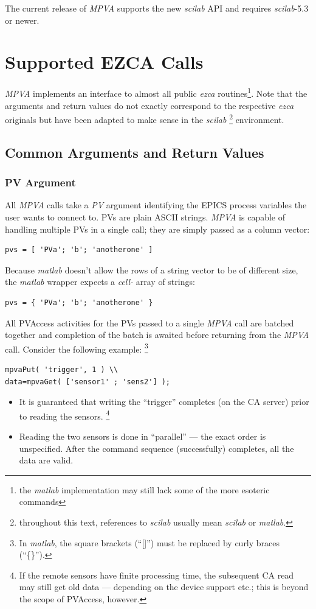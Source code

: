 \documentclass{article}
\newcommand{\sca}{\ita{MPVA}}
\newcommand{\scilab}{\ita{scilab}}
\newcommand{\matlab}{\ita{matlab}}
\newcommand{\ezca}{\ita{ezca}}
\newcommand{\pbrk}{\pagebreak[3]}
\newcommand{\ita}[1]{\emph{#1}}
\renewcommand{\pbrk}{}
\begin{document}
The current release of \sca{} supports the new \scilab{} API and
requires \scilab-5.3 or newer.

\vspace*{\fill}
\pbrk
\section{Supported EZCA Calls}
\sca{} implements an interface to almost all public
\ezca{} routines\footnote{%
the \matlab{} implementation may still lack some of the
more esoteric commands}. Note that the arguments and
return values do not exactly correspond to the respective
\ezca{} originals but have been adapted to make sense
in the  \scilab{}%
\footnote{throughout this text, references to \scilab{}
usually mean \scilab{} or \matlab.}
environment.

\subsection{Common Arguments and Return Values}
\subsubsection{PV Argument}
All \sca{} calls take a \ita{PV} argument identifying
the EPICS process variables the user wants to connect to.
PVs are plain ASCII strings. \sca{} is capable of handling
multiple PVs in a single call; they are simply passed as a
column vector:
\begin{verbatim}
pvs = [ 'PVa'; 'b'; 'anotherone' ]
\end{verbatim}
Because \matlab{} doesn't allow the rows of
a string vector to be of different size, the \matlab{}
wrapper expects a \ita{cell-} array of strings:
\begin{verbatim}
pvs = { 'PVa'; 'b'; 'anotherone' }
\end{verbatim}

All PVAccess activities for the PVs
passed to a single \sca{} call are batched together and
completion of the batch is awaited before returning from
the \sca{} call. Consider the following example:%
\footnote{
In \matlab{}, the square brackets (``[]'') must be replaced
by curly braces (``\{\}'').}
\begin{verbatim}
mpvaPut( 'trigger', 1 ) \\
data=mpvaGet( ['sensor1' ; 'sens2'] );
\end{verbatim}
\begin{itemize}
%
\item It is guaranteed that writing the ``trigger''
completes (on the CA server) prior to reading the
sensors.%
\footnote{If the remote sensors have finite
processing time, the subsequent CA read may still
get old data --- depending on the device support
etc.; this is beyond the scope of PVAccess, however.}
%
\item Reading the two sensors is done in ``parallel'' ---
the exact order is unspecified. After the command sequence
(successfully) completes, all the data are valid.
\end{itemize}
\end{document}
